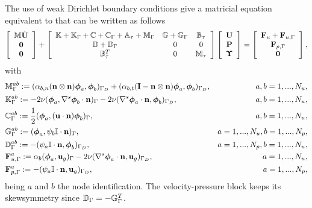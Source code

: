 The use of weak Dirichlet boundary conditions give a matricial equation equivalent to  that can be written as follows
\begin{equation}
\label{eq-C7_NSmatform_weak}
\left[\begin{array}{c}
\mathbb{M}\dot{{\bf U}}\\
\mathbf{0}\\
\mathbf{0}
\end{array}\right]+\left[\begin{array}{ccc}
\mathbb{K}+\mathbb{K}_\Gamma+\mathbb{C}+\mathbb{C}_\Gamma+\mathbb{A}_\tau+\mathbb{M}_\Gamma&\mathbb{G}+\mathbb{G}_\Gamma&\mathbb{B}_\tau\\
\mathbb{D}+\mathbb{D}_\Gamma&0&0\\
\mathbb{B}_\tau^T&0&\mathbb{M}_\tau
\end{array}\right]\left[\begin{array}{c}
{\bf U}\\
{\bf P}\\
\boldsymbol{\Upsilon}
\end{array}\right]=\left[\begin{array}{c}
{\bf F}_u+{\bf F}_{u,\Gamma}\\
{\bf F}_{p,\Gamma}\\
\mathbf{0}
\end{array}\right],
\end{equation}
with 
\begin{align*}
&\mathbb{M}_{\Gamma}^{ab}:=(\alpha_{b,n}({\bf n}\otimes{\bf n})\boldsymbol{\phi}_{a},\boldsymbol{\phi}_{b})_{\Gamma_D}+(\alpha_{b,t}(\mathbf{I}-{\bf n}\otimes{\bf n})\boldsymbol{\phi}_{a},\boldsymbol{\phi}_{b})_{\Gamma_D},&a,b=1,...,N_u,\\
&\mathbb{K}_{\Gamma}^{ab}:=-2\nu(\boldsymbol{\phi}_{a},\nabla^s\boldsymbol{\phi}_{b}\cdot{\bf n})_\Gamma-2\nu(\nabla^s\boldsymbol{\phi}_{a}\cdot{\bf n},\boldsymbol{\phi}_{b})_{\Gamma_D},&a,b=1,...,N_u,\\
&\mathbb{C}_{\Gamma}^{ab}:=\frac{1}{2}(\boldsymbol{\phi}_{a},({\bf u}\cdot{\bf n})\boldsymbol{\phi}_{b})_\Gamma,&a,b=1,...,N_u,\\
&\mathbb{G}_{\Gamma}^{ab}:=(\boldsymbol{\phi}_{a},\psi_{b}\mathbb{I}\cdot{\bf n})_\Gamma,&a=1,...,N_u,b=1,...,N_p,\\
&\mathbb{D}_{\Gamma}^{ab}:=-(\psi_{a}\mathbb{I}\cdot{\bf n},\boldsymbol{\phi}_{b})_{\Gamma_D},&a=1,...,N_p,b=1,...,N_u,\\
&{\bf F}_{u,\Gamma}^{a}:=\alpha_b(\boldsymbol{\phi}_{a},{\bf u}_g)_\Gamma-2\nu(\nabla^s\boldsymbol{\phi}_{a}\cdot{\bf n},{\bf u}_g)_{\Gamma_D},&a=1,...,N_u,\\
&{\bf F}_{p,\Gamma}^{a}:=-(\psi_{a}\mathbb{I}\cdot{\bf n},{\bf u}_g)_{\Gamma_D},&a=1,...,N_p,
\end{align*}
being $a$ and $b$ the node identification. The velocity-pressure block keeps its skewsymmetry since $\mathbb{D}_\Gamma=-\mathbb{G}_\Gamma^T$.

